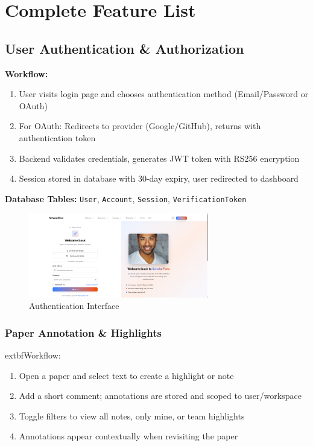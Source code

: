 \chapter{Complete Feature List}
\label{ch:features}

\section{User Authentication \& Authorization}
\label{sec:auth-features}

\textbf{Workflow:}
\begin{enumerate}[leftmargin=*,topsep=3pt,itemsep=2pt]
    \item User visits login page and chooses authentication method (Email/Password or OAuth)
    \item For OAuth: Redirects to provider (Google/GitHub), returns with authentication token
    \item Backend validates credentials, generates JWT token with RS256 encryption
    \item Session stored in database with 30-day expiry, user redirected to dashboard
\end{enumerate}

\textbf{Database Tables:} \texttt{User}, \texttt{Account}, \texttt{Session}, \texttt{VerificationToken}

\begin{figure}[H]
\centering
\includegraphics[width=0.7\textwidth]{images/screenshots/sign_in.png}
\caption{Authentication Interface}
\label{fig:auth}
\end{figure}

\subsection{Paper Annotation \& Highlights}

    extbf{Workflow:}
\begin{enumerate}[leftmargin=*,topsep=3pt,itemsep=2pt]
    \item Open a paper and select text to create a highlight or note
    \item Add a short comment; annotations are stored and scoped to user/workspace
    \item Toggle filters to view all notes, only mine, or team highlights
    \item Annotations appear contextually when revisiting the paper
\end{enumerate}

